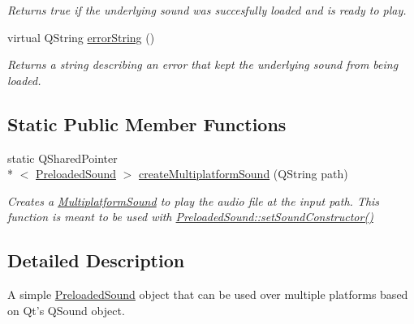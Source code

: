 \begin{DoxyCompactItemize}
\begin{DoxyCompactList}\small\item\em Returns true if the underlying sound was succesfully loaded and is ready to play. \end{DoxyCompactList}\item 
virtual Q\-String \hyperlink{class_picto_1_1_multiplatform_sound_a439672057dc19e9b8f9f2648cc31c01d}{error\-String} ()
\begin{DoxyCompactList}\small\item\em Returns a string describing an error that kept the underlying sound from being loaded. \end{DoxyCompactList}\end{DoxyCompactItemize}
\subsection*{Static Public Member Functions}
\begin{DoxyCompactItemize}
\item 
\hypertarget{class_picto_1_1_multiplatform_sound_a689f79ed1073d141c518c6e63d52ee61}{static Q\-Shared\-Pointer\\*
$<$ \hyperlink{class_picto_1_1_preloaded_sound}{Preloaded\-Sound} $>$ \hyperlink{class_picto_1_1_multiplatform_sound_a689f79ed1073d141c518c6e63d52ee61}{create\-Multiplatform\-Sound} (Q\-String path)}\label{class_picto_1_1_multiplatform_sound_a689f79ed1073d141c518c6e63d52ee61}

\begin{DoxyCompactList}\small\item\em Creates a \hyperlink{class_picto_1_1_multiplatform_sound}{Multiplatform\-Sound} to play the audio file at the input path.  This function is meant to be used with \hyperlink{class_picto_1_1_preloaded_sound_a52385d8c6fb8563fb8c82455f9677acc}{Preloaded\-Sound\-::set\-Sound\-Constructor()} \end{DoxyCompactList}\end{DoxyCompactItemize}


\subsection{Detailed Description}
A simple \hyperlink{class_picto_1_1_preloaded_sound}{Preloaded\-Sound} object that can be used over multiple platforms based on Qt's Q\-Sound object. 

